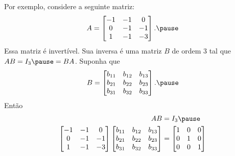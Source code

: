 \documentclass{beamer}
\begin{document}
    \begin{frame}
        Por exemplo, considere a seguinte matriz:
        \[
            A = \begin{bmatrix}
                -1 & -1 & 0\\
                0 & -1 & -1\\
                1 & -1 & -3
            \end{bmatrix}.\pause
        \]
        Essa matriz é invertível. \pause Sua inversa é uma matriz $B$ de ordem 3 \pause tal que $AB = I_3 \pause = BA$. \pause Suponha que
        \[
            B = \begin{bmatrix}
                b_{11} & b_{12} & b_{13}\\
                b_{21} & b_{22} & b_{23}\\
                b_{31} & b_{32} & b_{33}
            \end{bmatrix}.\pause
        \]
        Então\pause
        \begin{align*}
            AB &= I_3\pause\\
            \begin{bmatrix}-1 & -1 & 0\\0 & -1 & -1\\1 & -1 & -3\end{bmatrix}\begin{bmatrix}b_{11} & b_{12} & b_{13}\\b_{21} & b_{22} & b_{23}\\b_{31} & b_{32} & b_{33}\end{bmatrix} &= \begin{bmatrix}
                1 & 0 & 0\\0 & 1 & 0\\0 & 0 & 1
            \end{bmatrix}
        \end{align*}
    \end{frame}
\end{document}
